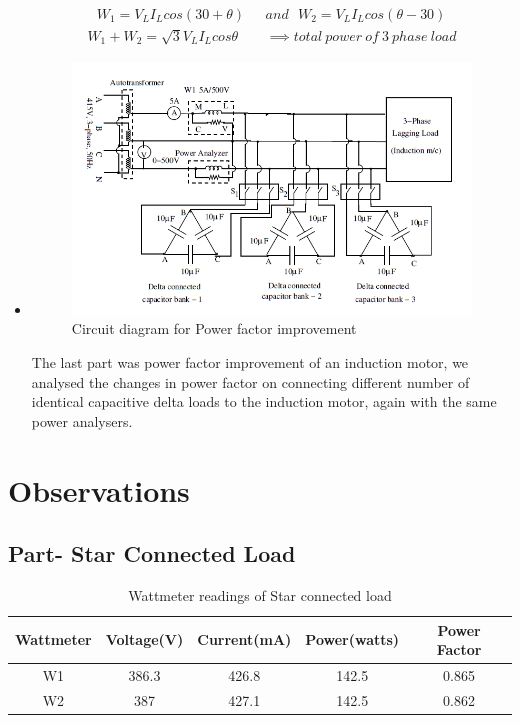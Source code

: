 \documentclass[12pt]{article}
\begin{document}
\begin{itemize}
      \begin{align}
          \ \ \ W_1 = V_{L}I_{L}cos(30 + \theta) \ \ \ &and \ \ \ W_2 = V_{L}I_{L}cos(\theta - 30) \\
          W_1 + W_2 = \sqrt{3}V_{L}I_{L}cos\theta &\implies total \ power \ of \ 3 \ phase \ load
      \end{align}
      
      \item 
      
      \begin{figure}[H]
          \centering
          \includegraphics[width = 0.9\linewidth]{LAB-1/2.PNG}
          \caption{Circuit diagram for Power factor improvement}
      \end{figure}
      
      The last part was power factor improvement of an induction motor, we analysed the changes in power factor on connecting different number of identical capacitive delta loads to the induction motor, again with the same power analysers.
      
      \end{itemize}
  
  
  \section{Observations}
  
      \subsection{Part- Star Connected Load}
      
          \begin{table}[H]
              \centering
              \begin{tabular}{|c|c|c|c|c|}
              \hline
                  Wattmeter & Voltage(V) & Current(mA) & Power(watts) & Power Factor \\
              \hline
              W1 & 386.3 & 426.8 & 142.5 & 0.865 \\
              W2 & 387 & 427.1 & 142.5 & 0.862 \\
              \hline
              \end{tabular}
              \caption{Wattmeter readings of Star connected load}
          \end{table}
\end{document}
